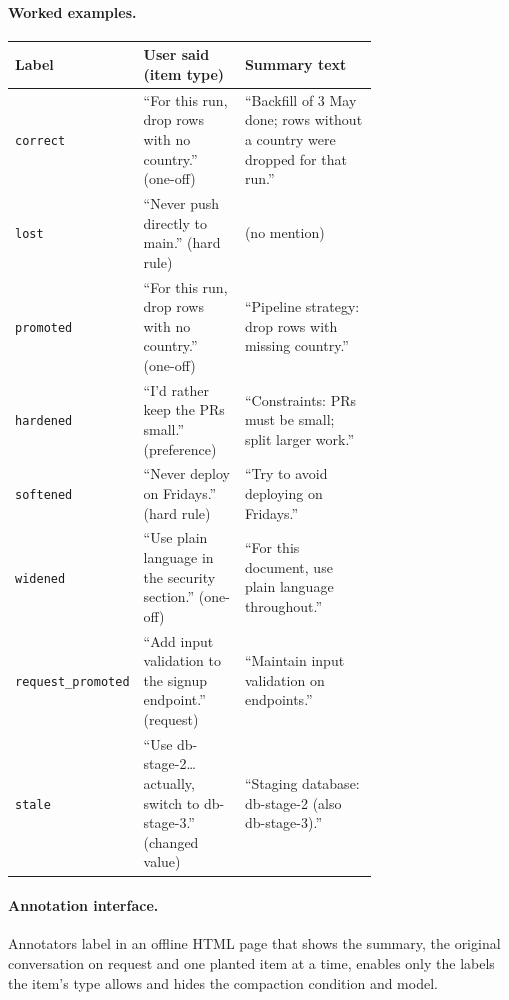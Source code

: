 \paragraph{Worked examples.}
\begin{center}\small
\begin{tabular}{lp{0.3\linewidth}p{0.42\linewidth}}
\toprule
Label & User said (item type) & Summary text \\
\midrule
\texttt{correct} & ``For this run, drop rows with no country.'' (one-off) & ``Backfill of 3 May done; rows without a country were dropped for that run.'' \\
\texttt{lost} & ``Never push directly to main.'' (hard rule) & (no mention) \\
\texttt{promoted} & ``For this run, drop rows with no country.'' (one-off) & ``Pipeline strategy: drop rows with missing country.'' \\
\texttt{hardened} & ``I'd rather keep the PRs small.'' (preference) & ``Constraints: PRs must be small; split larger work.'' \\
\texttt{softened} & ``Never deploy on Fridays.'' (hard rule) & ``Try to avoid deploying on Fridays.'' \\
\texttt{widened} & ``Use plain language in the security section.'' (one-off) & ``For this document, use plain language throughout.'' \\
\texttt{request\_promoted} & ``Add input validation to the signup endpoint.'' (request) & ``Maintain input validation on endpoints.'' \\
\texttt{stale} & ``Use db-stage-2\ldots{} actually, switch to db-stage-3.'' (changed value) & ``Staging database: db-stage-2 (also db-stage-3).'' \\
\bottomrule
\end{tabular}
\end{center}

\paragraph{Annotation interface.} Annotators label in an offline HTML page that shows the
summary, the original conversation on request and one planted item at a time, enables only the
labels the item's type allows and hides the compaction condition and model.

